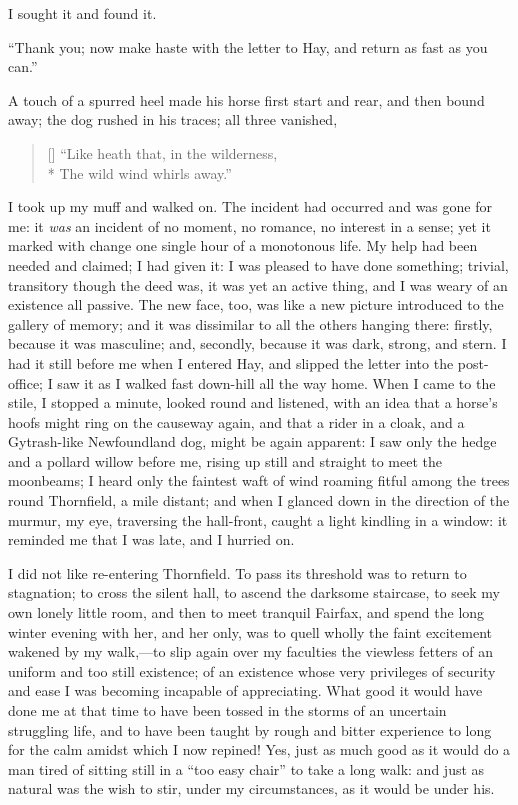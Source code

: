 I sought it and found it.

\enquote{Thank you; now make haste with the letter to Hay, and return as
	fast as you can.}

A touch of a spurred heel made his horse first start and rear, and then
bound away; the dog rushed in his traces; all three vanished,

\begin{verse}[\versewidth]
	\enquote{Like heath that, in the wilderness,\\*
		The wild wind whirls away.}
\end{verse}

I took up my muff and walked on. The incident had occurred and was gone
for me: it \emph{was} an incident of no moment, no romance, no interest
in a sense; yet it marked with change one single hour of a monotonous
life. My help had been needed and claimed; I had given it: I was
pleased to have done something; trivial, transitory though the deed was,
it was yet an active thing, and I was weary of an existence all
passive. The new face, too, was like a new picture introduced to the
gallery of memory; and it was dissimilar to all the others hanging
there: firstly, because it was masculine; and, secondly, because it was
dark, strong, and stern. I had it still before me when I entered Hay,
and slipped the letter into the post-office; I saw it as I walked fast
down-hill all the way home. When I came to the stile, I stopped a
minute, looked round and listened, with an idea that a horse's hoofs
might ring on the causeway again, and that a rider in a cloak, and a
Gytrash-like Newfoundland dog, might be again apparent: I saw only the
hedge and a pollard willow before me, rising up still and straight to
meet the moonbeams; I heard only the faintest waft of wind roaming
fitful among the trees round Thornfield, a mile distant; and when I
glanced down in the direction of the murmur, my eye, traversing the
hall-front, caught a light kindling in a window: it reminded me that I
was late, and I hurried on.

I did not like re-entering Thornfield. To pass its threshold was to
return to stagnation; to cross the silent hall, to ascend the darksome
staircase, to seek my own lonely little room, and then to meet tranquil
\Mrs{} Fairfax, and spend the long winter evening with her, and her only,
was to quell wholly the faint excitement wakened by my walk,---to slip
again over my faculties the viewless fetters of an uniform and too still
existence; of an existence whose very privileges of security and ease I
was becoming incapable of appreciating. What good it would have done me
at that time to have been tossed in the storms of an uncertain
struggling life, and to have been taught by rough and bitter experience
to long for the calm amidst which I now repined! Yes, just as much good
as it would do a man tired of sitting still in a \enquote{too easy
	chair} to take a long walk: and just as natural was the wish to stir,
under my circumstances, as it would be under his.

